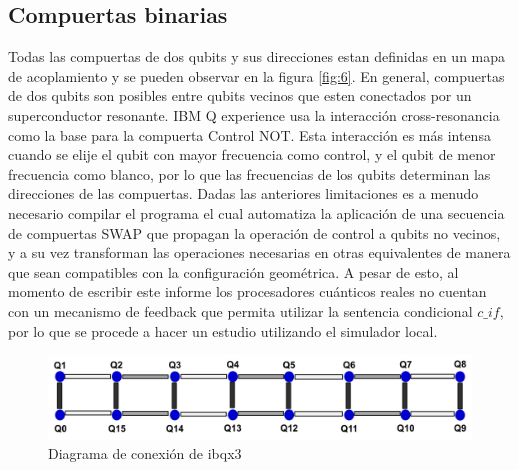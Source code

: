 \documentclass{article}
\begin{document}
\subsection*{Compuertas binarias}
Todas las compuertas de dos qubits y sus direcciones estan definidas en un mapa de acoplamiento y se pueden observar en la figura \ref{fig:6}. En general, compuertas de dos qubits son posibles entre qubits vecinos que esten conectados por un superconductor resonante. IBM Q experience usa la interacción cross-resonancia como la base para la compuerta Control NOT. Esta interacción es más intensa cuando se elije el qubit con mayor frecuencia como control, y el qubit de menor frecuencia como blanco, por lo que las frecuencias de los qubits determinan las direcciones de las compuertas.
Dadas las anteriores limitaciones es a menudo necesario compilar el programa el cual automatiza la aplicación de una secuencia de compuertas SWAP que propagan la operación de control a qubits no vecinos, y a su vez transforman las operaciones necesarias en otras equivalentes de manera que sean compatibles con la configuración geométrica. A pesar de esto, al momento de escribir este informe los procesadores cuánticos reales no cuentan con un mecanismo de feedback que permita utilizar la sentencia condicional $c\_if$, por lo que se procede a hacer un estudio utilizando el simulador local.

\begin{center}
\begin{figure}[H]
    \centering
    \includegraphics[scale=0.25]{img/ibmqx3-bus.png}
    \caption{Diagrama de conexión de ibqx3}
    \label{fig:4}
\end{figure}
\end{center}
\end{document}
